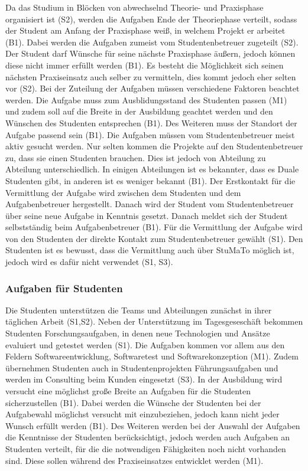 \documentclass[
  12pt,
  ngerman,
  a4paper,
]{article}
\begin{document}
Da das Studium in Blöcken von abwechselnd Theorie- und Praxisphase
organisiert ist (S2), werden die Aufgaben Ende der Theoriephase
verteilt, sodass der Student am Anfang der Praxisphase weiß, in welchem
Projekt er arbeitet (B1). Dabei werden die Aufgaben zumeist vom
Studentenbetreuer zugeteilt (S2). Der Student darf Wünsche für seine
nächste Praxisphase äußern, jedoch können diese nicht immer erfüllt
werden (B1). Es besteht die Möglichkeit sich seinen nächsten
Praxiseinsatz auch selber zu vermitteln, dies kommt jedoch eher selten
vor (S2). Bei der Zuteilung der Aufgaben müssen verschiedene Faktoren
beachtet werden. Die Aufgabe muss zum Ausblidungsstand des Studenten
passen (M1) und zudem soll auf die Breite in der Ausbildung geachtet
werden und den Wünschen des Studenten entsprechen (B1). Des Weiteren
muss der Standort der Aufgabe passend sein (B1). Die Aufgaben müssen vom
Studentenbetreuer meist aktiv gesucht werden. Nur selten kommen die
Projekte auf den Studentenbetreuer zu, dass sie einen Studenten
brauchen. Dies ist jedoch von Abteilung zu Abteilung unterschiedlich. In
einigen Abteilungen ist es bekannter, dass es Duale Studenten gibt, in
anderen ist es weniger bekannt (B1). Der Erstkontakt für die Vermittlung
der Aufgabe wird zwischen dem Studenten und dem Aufgabenbetreuer
hergestellt. Danach wird der Student vom Studentenbetreuer über seine
neue Aufgabe in Kenntnis gesetzt. Danach meldet sich der Student
selbstständig beim Aufgabenbetreuer (B1). Für die Vermittlung der
Aufgabe wird von den Studenten der direkte Kontakt zum Studentenbetreuer
gewählt (S1). Den Studenten ist es bewusst, dass die Vermittlung auch
über StuMaTo möglich ist, jedoch wird es dafür nicht verwendet (S1, S3).

\hypertarget{aufgaben-fuxfcr-studenten}{%
\subsubsection{Aufgaben für Studenten}\label{aufgaben-fuxfcr-studenten}}

Die Studenten unterstützen die Teams und Abteilungen zunächst in ihrer
täglichen Arbeit (S1,S2). Neben der Unterstützung im Tagesgeseschäft
bekommen Studenten Forschungsaufgaben, in denen neue Technologien und
Ansätze evaluiert und getestet werden (S1). Die Aufgaben kommen vor
allem aus den Feldern Softwareentwicklung, Softwaretest und
Softwarekonzeption (M1). Zudem übernehmen Studenten auch in
Studentenprojekten Führungsaufgaben und werden im Consulting beim Kunden
eingesetzt (S3). In der Ausbildung wird versucht eine möglichst große
Breite an Aufgaben für die Studenten sicherzustellen (B1). Dabei werden
die Wünsche der Studenten bei der Aufgabewahl möglichst versucht mit
einzubeziehen, jedoch kann nicht jeder Wunsch erfüllt werden (B1). Des
Weiteren werden bei der Auswahl der Aufgaben die Kenntnisse der
Studenten berücksichtigt, jedoch werden auch Aufgaben an Studenten
verteilt, für die die notwendigen Fähigkeiten noch nicht vorhanden sind.
Diese sollen während des Praxiseinsatzes entwicklet werden (M1).
\end{document}
